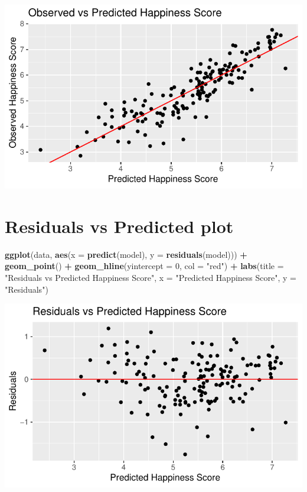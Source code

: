 \documentclass[
  11pt,
]{article}
\newenvironment{Shaded}{\begin{snugshade}}{\end{snugshade}}
\newcommand{\AttributeTok}[1]{\textcolor[rgb]{0.13,0.29,0.53}{#1}}
\newcommand{\DecValTok}[1]{\textcolor[rgb]{0.00,0.00,0.81}{#1}}
\newcommand{\FunctionTok}[1]{\textcolor[rgb]{0.13,0.29,0.53}{\textbf{#1}}}
\newcommand{\NormalTok}[1]{#1}
\newcommand{\SpecialCharTok}[1]{\textcolor[rgb]{0.81,0.36,0.00}{\textbf{#1}}}
\newcommand{\StringTok}[1]{\textcolor[rgb]{0.31,0.60,0.02}{#1}}
\begin{document}
\begin{center}\includegraphics[width=0.7\linewidth]{Group_project_2_files/figure-latex/unnamed-chunk-38-1} \end{center}

\section{Residuals vs Predicted plot}\label{residuals-vs-predicted-plot}

\begin{Shaded}
\begin{Highlighting}[]
\FunctionTok{ggplot}\NormalTok{(data, }\FunctionTok{aes}\NormalTok{(}\AttributeTok{x =} \FunctionTok{predict}\NormalTok{(model), }\AttributeTok{y =} \FunctionTok{residuals}\NormalTok{(model))) }\SpecialCharTok{+}
  \FunctionTok{geom\_point}\NormalTok{() }\SpecialCharTok{+}
  \FunctionTok{geom\_hline}\NormalTok{(}\AttributeTok{yintercept =} \DecValTok{0}\NormalTok{, }\AttributeTok{col =} \StringTok{"red"}\NormalTok{) }\SpecialCharTok{+}
  \FunctionTok{labs}\NormalTok{(}\AttributeTok{title =} \StringTok{"Residuals vs Predicted Happiness Score"}\NormalTok{,}
       \AttributeTok{x =} \StringTok{"Predicted Happiness Score"}\NormalTok{, }
       \AttributeTok{y =} \StringTok{"Residuals"}\NormalTok{)}
\end{Highlighting}
\end{Shaded}

\begin{center}\includegraphics[width=0.7\linewidth]{Group_project_2_files/figure-latex/unnamed-chunk-39-1} \end{center}
\end{document}
